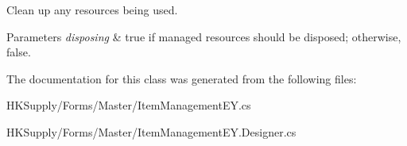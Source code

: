 Clean up any resources being used. 


\begin{DoxyParams}{Parameters}
{\em disposing} & true if managed resources should be disposed; otherwise, false.\\
\hline
\end{DoxyParams}


The documentation for this class was generated from the following files\+:\begin{DoxyCompactItemize}
\item 
H\+K\+Supply/\+Forms/\+Master/Item\+Management\+E\+Y.\+cs\item 
H\+K\+Supply/\+Forms/\+Master/Item\+Management\+E\+Y.\+Designer.\+cs\end{DoxyCompactItemize}
